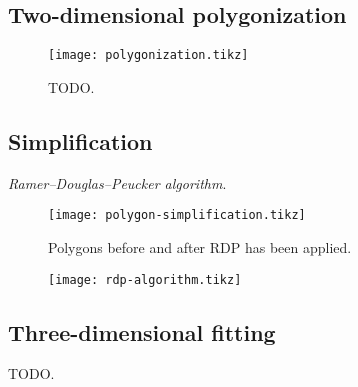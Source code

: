 \subsection{Two-dimensional polygonization}

\begin{figure}[H]
  \centering
  \texttt{[image: polygonization.tikz]}
  \caption{TODO.}
\end{figure}

\subsection{Simplification}%
\label{sec:simplification}

\textit{Ramer–Douglas–Peucker algorithm}.

\begin{figure}[H]
  \centering
  \texttt{[image: polygon-simplification.tikz]}
  \caption{Polygons before and after RDP has been applied.}
\end{figure}

\begin{figure}
  \centering
  \texttt{[image: rdp-algorithm.tikz]}
  \label{}
\end{figure}

\subsection{Three-dimensional fitting}

TODO.
